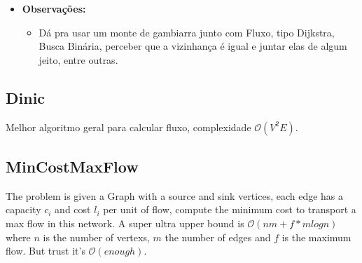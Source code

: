     \begin{itemize}
        \item \textbf{Observações:}
        \begin{itemize}
            \item Dá pra usar um monte de gambiarra junto com Fluxo, tipo Dijkstra, Busca Binária, perceber que a vizinhança é igual e juntar elas de algum jeito, entre outras.
        \end{itemize}
    \end{itemize}
    
    \subsection{Dinic}
        Melhor algoritmo geral para calcular fluxo, complexidade $\mathcal{O}(V^2E)$.
        
    \subsection{MinCostMaxFlow}
            The problem is given a Graph with a source and sink vertices, each edge has a capacity $c_i$ and cost $l_i$ per unit of flow, compute the minimum cost to transport a max flow in this network. A super ultra upper bound is $\mathcal{O}(nm + f * m log n)$ where $n$ is the number of vertexs, $m$ the number of edges and $f$ is the maximum flow. But trust it's $\mathcal{O}(enough)$.

